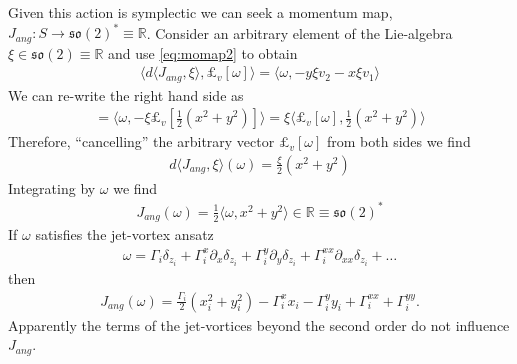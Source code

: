 \documentclass[12pt]{amsart}
\begin{document}
Given this action is symplectic we can seek a momentum map, $J_{ang}:S \to \mathfrak{so}(2)^* \equiv \mathbb{R}$.  Consider an arbitrary element of the Lie-algebra $\xi \in \mathfrak{so}(2) \equiv \mathbb{R}$ and use \eqref{eq:momap2} to obtain
\begin{align*}
  \langle d \langle J_{ang} , \xi \rangle , \pounds_v[\omega] \rangle
  = \langle \omega , -y\xi v_2 - x\xi v_1 \rangle
\end{align*}
We can re-write the right hand side as
\begin{align*}
  = \langle \omega , - \xi \pounds_v[\frac{1}{2} (x^2 + y^2)] \rangle 
  = \xi \langle \pounds_v[\omega] , \frac{1}{2}(x^2 + y^2) \rangle
\end{align*}
Therefore, ``cancelling'' the arbitrary vector $\pounds_v[\omega]$ from both sides we find
\begin{align*}
  d \langle J_{ang} , \xi \rangle(\omega) = \frac{\xi}{2}(x^2+y^2)
\end{align*}
Integrating by $\omega$ we find
\begin{align*}
  \boxed{
    J_{ang}(\omega) = \frac{1}{2}\langle \omega, x^2 + y^2\rangle \in \mathbb{R} \equiv \mathfrak{so}(2)^*
    }
\end{align*}
If $\omega$ satisfies the jet-vortex ansatz
\begin{align*}
  \omega = \Gamma_i \delta_{z_i} + \Gamma_i^x \partial_x \delta_{z_i} + \Gamma_i^y \partial_y \delta_{z_i} + \Gamma_i^{xx} \partial_{xx} \delta_{z_i} + \dots
\end{align*}
then
\begin{align*}
  J_{ang}(\omega) = \frac{\Gamma_i}{2} (x_i^2 + y_i^2) - \Gamma_i^x x_i - \Gamma_i^y y_i + \Gamma_i^{xx} + \Gamma_i^{yy} .
\end{align*}
Apparently the terms of the jet-vortices beyond the second order do not influence $J_{ang}$.
\end{document}
